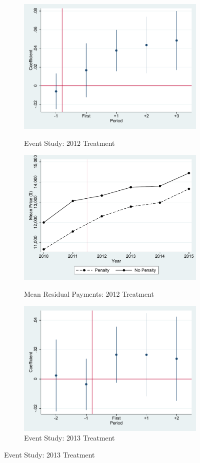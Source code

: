 \documentclass[12pt]{article}
\begin{document}
\begin{figure}[!htb]
\caption{Evidence of Parallel or Differential Trends, 2012 and 2013}
\label{fig:event_resid1}
\begin{subfigure}{.5\textwidth}
 \caption{Event Study: 2012 Treatment}
  \centering
  \includegraphics[width=.8\linewidth]{ev_lnprice_hcci_2012.pdf}
  \label{fig:sfig1}
\end{subfigure}%
\begin{subfigure}{.5\textwidth}
  \centering
  \caption{Mean Residual Payments: 2012 Treatment}
  \includegraphics[width=.8\linewidth]{price_resid_2012.pdf}
  \label{fig:sfig2}
\end{subfigure}
\begin{subfigure}{.5\textwidth}
  \centering
  \caption{Event Study: 2013 Treatment}
  \includegraphics[width=.8\linewidth]{ev_lnprice_hcci_2013.pdf}

\end{subfigure}
\end{figure}
\end{document}
